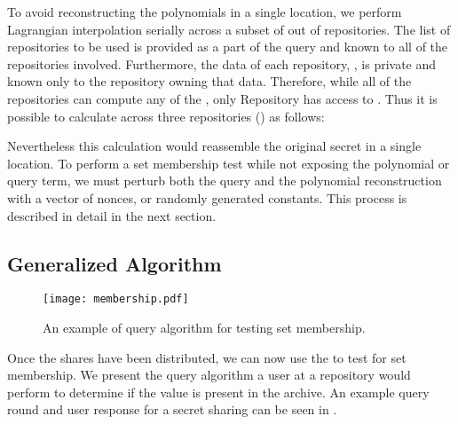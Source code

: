 To avoid reconstructing the polynomials in a single location, we
perform Lagrangian interpolation serially across a subset of  out
of  repositories.  The list of  repositories to be used is
provided as a part of the \SIF query and known to all of the
repositories involved.  Furthermore, the data of each repository,
, is private and known only to the repository owning
that data. Therefore, while all of the repositories can compute any of
the , only Repository  has access to . Thus it is possible to calculate  across three
repositories () as follows:





Nevertheless this calculation would reassemble the original secret in
a single location. To perform a set membership test while not exposing the
polynomial or query term, we must perturb both the query and the
polynomial reconstruction with a vector of nonces, or randomly generated
constants. This process is described in 
detail in the next section.

\subsection{Generalized Algorithm}\label{ssec:sif:general}

\begin{figure}[t]
\begin{center}
\begin{adjustbox}{max totalsize={0.95\columnwidth}{0.95\columnwidth},center}
\texttt{[image: membership.pdf]}
\end{adjustbox}
\end{center}
\caption{An example of query algorithm for testing set membership.}
\label{fig:query}
\end{figure}

Once the shares have been distributed, we can now use the \SIF to
test for set membership. We present
the query algorithm a user at a repository would perform to determine if
the value  is present in the archive.  An example query round and 
user response for a  secret sharing can be seen in 
.

